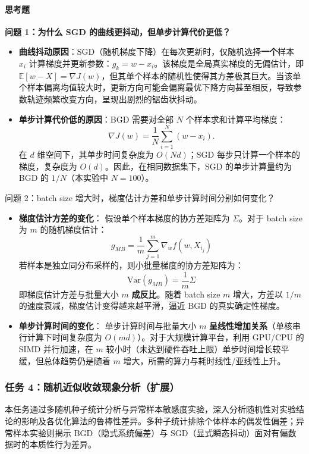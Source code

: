 \documentclass[11pt,a4paper,UTF8]{ctexart}
\numberwithin{figure}{section}
\numberwithin{table}{section}
\newcommand{\answerlabel}{%
  \par\smallskip\noindent{\heiti\bfseries 回答：}\quad}
\begin{document}
\paragraph{思考题}



\textbf{问题 1：为什么 SGD 的曲线更抖动，但单步计算代价更低？}


\answerlabel 
\begin{itemize}
\item \textbf{曲线抖动原因}：SGD（随机梯度下降）在每次更新时，仅随机选择\textbf{一个}样本 $x_i$ 计算梯度并更新参数：$g_k = w - x_i$。该梯度是全局真实梯度的无偏估计，即 $\mathbb{E}[w - X] = \nabla J(w)$，但其单个样本的随机性使得其方差极其巨大。当该单个样本偏离均值较大时，更新方向可能会偏离最优下降方向甚至相反，导致参数轨迹频繁改变方向，呈现出剧烈的锯齿状抖动。
\item \textbf{单步计算代价低的原因}：BGD 需要对全部 $N$ 个样本求和计算平均梯度：
\[
\nabla J(w) = \frac{1}{N} \sum_{i=1}^N (w - x_i).
\]
在 $d$ 维空间下，其单步时间复杂度为 $O(Nd)$；SGD 每步只计算一个样本的梯度，复杂度为 $O(d)$。因此，在相同数据集下，SGD 的单步计算量约为 BGD 的 $1/N$（本实验中 $N=100$）。
\end{itemize}

问题 2：batch size 增大时，梯度估计方差和单步计算时间分别如何变化？
\answerlabel 
\begin{itemize}
\item \textbf{梯度估计方差的变化}：
  假设单个样本梯度的协方差矩阵为 $\Sigma$。对于 batch size 为 $m$ 的随机梯度估计：
  $$g_{MB} = \frac{1}{m}\sum_{j=1}^m \nabla_w f(w, X_{i_j})$$
  若样本是独立同分布采样的，则小批量梯度的协方差矩阵为：
  $$\text{Var}(g_{MB}) = \frac{1}{m} \Sigma$$
  即梯度估计方差与批量大小 $m$ \textbf{成反比}。随着 batch size $m$ 增大，方差以 $1/m$ 的速度衰减，梯度估计变得越来越平滑，逼近 BGD 的真实确定性梯度。
\item \textbf{单步计算时间的变化}：
  单步计算时间与批量大小 $m$ \textbf{呈线性增加关系}（单核串行计算下时间复杂度为 $O(md)$）。对于大规模计算平台，利用 GPU/CPU 的 SIMD 并行加速，在 $m$ 较小时（未达到硬件吞吐上限）单步时间增长较平缓，但总体趋势仍是随着 $m$ 增大，所需的算力与耗时线性/亚线性上升。
\end{itemize}

\subsubsection{任务 4：随机近似收敛现象分析（扩展）}

本任务通过多随机种子统计分析与异常样本敏感度实验，深入分析随机性对实验结论的影响及各优化算法的鲁棒性差异。多种子统计排除个体样本的偶发性偏差；异常样本实验则揭示 BGD（隐式系统偏差）与 SGD（显式瞬态抖动）面对有偏数据时的本质性行为差异。
\end{document}
